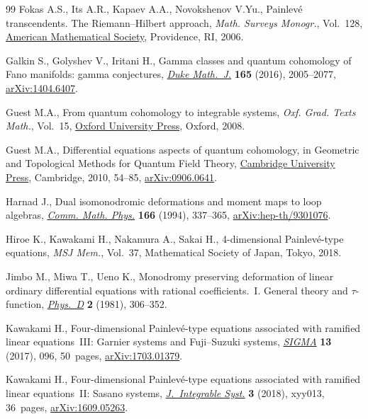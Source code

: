 \documentclass[10pt,a4paper]{amsart}
\numberwithin{equation}{section}
\begin{document}
\begin{thebibliography}{99}
Fokas A.S., Its A.R., Kapaev A.A., Novokshenov V.Yu., Painlev\'e transcendents.
 The {R}iemann--{H}ilbert approach, \textit{Math. Surveys Monogr.}, Vol.~128,
 \href{https://doi.org/10.1090/surv/128}{American Mathematical Society}, Providence, RI, 2006.

Galkin S., Golyshev V., Iritani H., Gamma classes and quantum cohomology of
 {F}ano manifolds: gamma conjectures,
 \href{https://doi.org/10.1215/00127094-3476593}{\textit{Duke Math.~J.}}
 \textbf{165} (2016), 2005--2077,
 \href{http://arxiv.org/abs/1404.6407}{arXiv:1404.6407}.

Guest M.A., From quantum cohomology to integrable systems, \textit{Oxf. Grad.
 Texts Math.}, Vol.~15,
 \href{https://doi.org/10.1093/oso/9780198565994.001.0001}{Oxford University
 Press}, Oxford, 2008.

Guest M.A., Differential equations aspects of quantum cohomology, in Geometric
 and {T}opological {M}ethods for {Q}uantum {F}ield {T}heory,
 \href{https://doi.org/10.1017/CBO9780511712135.003}{Cambridge University
 Press}, Cambridge, 2010, 54--85,
 \href{http://arxiv.org/abs/0906.0641}{arXiv:0906.0641}.

Harnad J., Dual isomonodromic deformations and moment maps to loop algebras,
 \href{https://doi.org/10.1007/BF02112319}{\textit{Comm. Math. Phys.}}
 \textbf{166} (1994), 337--365,
 \href{http://arxiv.org/abs/hep-th/9301076}{arXiv:hep-th/9301076}.

Hiroe K., Kawakami H., Nakamura A., Sakai H., 4-dimensional {P}ainlev\'e-type
 equations, \textit{MSJ Mem.}, Vol.~37, Mathematical Society of Japan, Tokyo,
 2018.

Jimbo M., Miwa T., Ueno K., Monodromy preserving deformation of linear ordinary
 differential equations with rational coefficients.~{I}. {G}eneral theory and
 {$\tau $}-function,
 \href{https://doi.org/10.1016/0167-2789(81)90013-0}{\textit{Phys.~D}}
 \textbf{2} (1981), 306--352.

Kawakami H., Four-dimensional {P}ainlev\'e-type equations associated with
 ramified linear equations~{III}: {G}arnier systems and {F}uji--{S}uzuki
 systems, \href{https://doi.org/10.3842/SIGMA.2017.096}{\textit{SIGMA}}
 \textbf{13} (2017), 096, 50~pages,
 \href{http://arxiv.org/abs/1703.01379}{arXiv:1703.01379}.

Kawakami H., Four-dimensional {P}ainlev\'e-type equations associated with
 ramified linear equations~{II}: {S}asano systems,
 \href{https://doi.org/10.1093/integr/xyy013}{\textit{J.~Integrable Syst.}}
 \textbf{3} (2018), xyy013, 36~pages,
 \href{http://arxiv.org/abs/1609.05263}{arXiv:1609.05263}.


\end{thebibliography}
\end{document}
